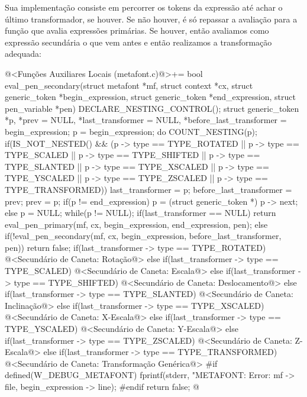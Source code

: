 {Sua implementação consiste em percorrer os tokens da expressão até
achar o último transformador, se houver. Se não houver, é só repassar
a avaliação para a função que avalia expressões primárias. Se houver,
então avaliamos como expressão secundária o que vem antes e então
realizamos a transformação adequada:

\iniciocodigo
@<Funções Auxiliares Locais (metafont.c)@>+=
bool eval_pen_secondary(struct metafont *mf, struct context *cx,
                        struct generic_token *begin_expression,
                        struct generic_token *end_expression,
                        struct pen_variable *pen){
  DECLARE_NESTING_CONTROL();
  struct generic_token *p, *prev = NULL, *last_transformer = NULL,
                       *before_last_transformer = begin_expression;
  p = begin_expression;
  do{
    COUNT_NESTING(p);
    if(IS_NOT_NESTED() && (p -> type == TYPE_ROTATED ||
       p -> type == TYPE_SCALED || p -> type == TYPE_SHIFTED ||
       p -> type == TYPE_SLANTED || p -> type == TYPE_XSCALED ||
       p -> type == TYPE_YSCALED || p -> type == TYPE_ZSCALED ||
       p -> type == TYPE_TRANSFORMED)){
      last_transformer = p;
      before_last_transformer = prev;
    }
    prev = p;
    if(p != end_expression)
      p = (struct generic_token *) p -> next;
    else
      p = NULL;
  }while(p != NULL);
  if(last_transformer == NULL)
    return eval_pen_primary(mf, cx, begin_expression, end_expression, pen);
  else{
    if(!eval_pen_secondary(mf, cx, begin_expression, before_last_transformer, pen))
      return false;
    if(last_transformer -> type == TYPE_ROTATED){
      @<Secundário de Caneta: Rotação@>
    }
    else if(last_transformer -> type == TYPE_SCALED){
      @<Secundário de Caneta: Escala@>
    }
    else if(last_transformer -> type == TYPE_SHIFTED){
      @<Secundário de Caneta: Deslocamento@>
    }
    else if(last_transformer -> type == TYPE_SLANTED){
      @<Secundário de Caneta: Inclinação@>
    }
    else if(last_transformer -> type == TYPE_XSCALED){
      @<Secundário de Caneta: X-Escala@>
    }
    else if(last_transformer -> type == TYPE_YSCALED){
      @<Secundário de Caneta: Y-Escala@>
    }
    else if(last_transformer -> type == TYPE_ZSCALED){
      @<Secundário de Caneta: Z-Escala@>
    }
    else if(last_transformer -> type == TYPE_TRANSFORMED){
      @<Secundário de Caneta: Transformação Genérica@>
    }
#if defined(W_DEBUG_METAFONT)
    fprintf(stderr, "METAFONT: Error: %
            mf -> file, begin_expression -> line);
#endif
    return false;
  }
}
@
\fimcodigo

}
